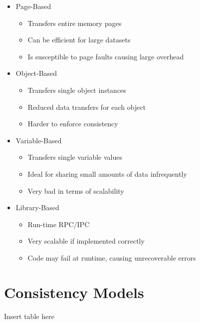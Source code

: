\begin{itemize}
  \item Page-Based
  \begin{itemize}
    \item Transfers entire memory pages
    \item Can be efficient for large datasets
    \item Is susceptible to page faults causing large overhead
  \end{itemize}
  \item Object-Based
  \begin{itemize}
    \item Transfers single object instances
    \item Reduced data transfers for each object
    \item Harder to enforce consistency
  \end{itemize}
  \item Variable-Based
  \begin{itemize}
    \item Transfers single variable values
    \item Ideal for sharing small amounts of data infrequently
    \item Very bad in terms of scalability
  \end{itemize}
  \item Library-Based
  \begin{itemize}
    \item Run-time RPC/IPC
    \item Very scalable if implemented correctly
    \item Code may fail at runtime, causing unrecoverable errors
  \end{itemize}
\end{itemize}

\section*{Consistency Models}

{\huge Insert table here}